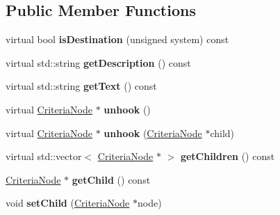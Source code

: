 \subsection*{Public Member Functions}
\begin{DoxyCompactItemize}
\item 
virtual bool {\bfseries is\+Destination} (unsigned system) const \hypertarget{classCriteriaRoot_ae3223360383a9c38ad0d94adb744e018}{}\label{classCriteriaRoot_ae3223360383a9c38ad0d94adb744e018}

\item 
virtual std\+::string {\bfseries get\+Description} () const \hypertarget{classCriteriaRoot_aec4a2ddffcc0c50dca16c04864634570}{}\label{classCriteriaRoot_aec4a2ddffcc0c50dca16c04864634570}

\item 
virtual std\+::string {\bfseries get\+Text} () const \hypertarget{classCriteriaRoot_aacc4f4ea5b41f30d27611f0e1b174c29}{}\label{classCriteriaRoot_aacc4f4ea5b41f30d27611f0e1b174c29}

\item 
virtual \hyperlink{classCriteriaNode}{Criteria\+Node} $\ast$ {\bfseries unhook} ()\hypertarget{classCriteriaRoot_a98095b193b1303802d576a8dbd75b3c9}{}\label{classCriteriaRoot_a98095b193b1303802d576a8dbd75b3c9}

\item 
virtual \hyperlink{classCriteriaNode}{Criteria\+Node} $\ast$ {\bfseries unhook} (\hyperlink{classCriteriaNode}{Criteria\+Node} $\ast$child)\hypertarget{classCriteriaRoot_ae2b34b4983db54a4fb048d456a2ec46b}{}\label{classCriteriaRoot_ae2b34b4983db54a4fb048d456a2ec46b}

\item 
virtual std\+::vector$<$ \hyperlink{classCriteriaNode}{Criteria\+Node} $\ast$ $>$ {\bfseries get\+Children} () const \hypertarget{classCriteriaRoot_afa413fc2d32bb15fcf57b2e93a773f58}{}\label{classCriteriaRoot_afa413fc2d32bb15fcf57b2e93a773f58}

\item 
\hyperlink{classCriteriaNode}{Criteria\+Node} $\ast$ {\bfseries get\+Child} () const \hypertarget{classCriteriaRoot_aff07505671119abbe2a18804d3cc7509}{}\label{classCriteriaRoot_aff07505671119abbe2a18804d3cc7509}

\item 
void {\bfseries set\+Child} (\hyperlink{classCriteriaNode}{Criteria\+Node} $\ast$node)\hypertarget{classCriteriaRoot_abc6d548ab17ebd5055ca224e4b03f1cf}{}\label{classCriteriaRoot_abc6d548ab17ebd5055ca224e4b03f1cf}


\end{DoxyCompactItemize}
